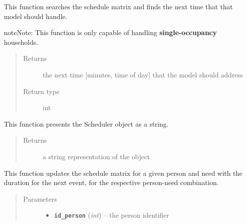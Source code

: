 \documentclass[letterpaper,10pt,english]{sphinxmanual}
\begin{document}
\begin{fulllineitems}
\begin{quote}
\begin{description}
\begin{itemize}
\end{itemize}

\end{description}\end{quote}

\begin{fulllineitems}
\label{scheduler:scheduler.Scheduler.get_next_event_time}
This function searches the schedule matrix and finds the next time that that model should handle.

\begin{notice}{note}{Note:}
This function is only capable of handling \textbf{single-occupancy} households.
\end{notice}
\begin{quote}\begin{description}
\item[{Returns}] \leavevmode
the next time {[}minutes, time of day{]} that the model should address

\item[{Return type}] \leavevmode
int

\end{description}\end{quote}

\end{fulllineitems}


\begin{fulllineitems}
\label{scheduler:scheduler.Scheduler.toString}
This function presents the Scheduler object as a string.
\begin{quote}\begin{description}
\item[{Returns}] \leavevmode
a string representation of the object

\end{description}\end{quote}

\end{fulllineitems}


\begin{fulllineitems}
\label{scheduler:scheduler.Scheduler.update}
This function updates the schedule matrix for a given person and need with the duration for the next event, 
for the respective person-need combination.
\begin{quote}\begin{description}
\item[{Parameters}] \leavevmode\begin{itemize}
\item {} 
\textbf{\texttt{id\_person}} (\emph{int}) -- the person identifier


\end{itemize}
\end{description}
\end{quote}
\end{fulllineitems}
\end{fulllineitems}
\end{document}
